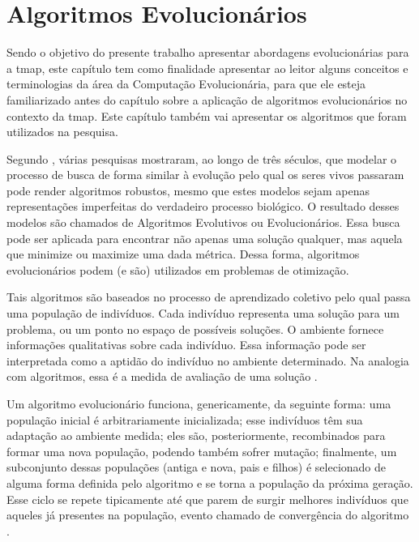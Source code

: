 \chapter{Algoritmos Evolucionários}
\label{alg_evo}

Sendo o objetivo do presente trabalho apresentar abordagens evolucionárias para 
a \ac{tmap}, este capítulo tem como finalidade apresentar ao leitor alguns 
conceitos e terminologias da área da Computação Evolucionária, para que ele 
esteja familiarizado antes do capítulo sobre a aplicação de algoritmos 
evolucionários no contexto da \ac{tmap}. Este capítulo também vai apresentar os 
algoritmos que foram utilizados na pesquisa.

Segundo \citep{Back:1993:OEA:1326623.1326625}, várias pesquisas mostraram, ao 
longo de três séculos, que modelar o processo de busca de forma similar à evolução 
pelo qual os seres vivos passaram pode render algoritmos robustos, mesmo que 
estes modelos sejam apenas representações imperfeitas do verdadeiro processo 
biológico. O resultado desses modelos são chamados de Algoritmos Evolutivos ou 
Evolucionários. Essa busca pode ser aplicada para encontrar não apenas uma 
solução qualquer, mas aquela que minimize ou maximize uma dada métrica. Dessa 
forma, algoritmos evolucionários podem (e são) utilizados em problemas de 
otimização.

Tais algoritmos são baseados no processo de aprendizado coletivo pelo qual passa 
uma população de indivíduos. Cada indivíduo representa uma solução para um 
problema, ou um ponto no espaço de possíveis soluções. O ambiente fornece 
informações qualitativas sobre cada indivíduo. Essa informação pode ser 
interpretada como a aptidão do indivíduo no ambiente determinado. Na 
analogia com algoritmos, essa é a medida de avaliação de uma solução 
\citep{Back:1993:OEA:1326623.1326625}.

Um algoritmo evolucionário funciona, genericamente, da seguinte forma: uma 
população inicial é arbitrariamente inicializada; esse indivíduos têm sua 
adaptação ao ambiente medida; eles são, posteriormente, recombinados para formar 
uma nova população, podendo também sofrer mutação; finalmente, um subconjunto 
dessas populações (antiga e nova, pais e filhos) é selecionado de alguma forma 
definida pelo algoritmo e se torna a população da próxima geração. Esse ciclo 
se repete tipicamente até que parem de surgir melhores indivíduos que aqueles já 
presentes na população, evento chamado de convergência do algoritmo 
\citep{Back:1993:OEA:1326623.1326625}.

